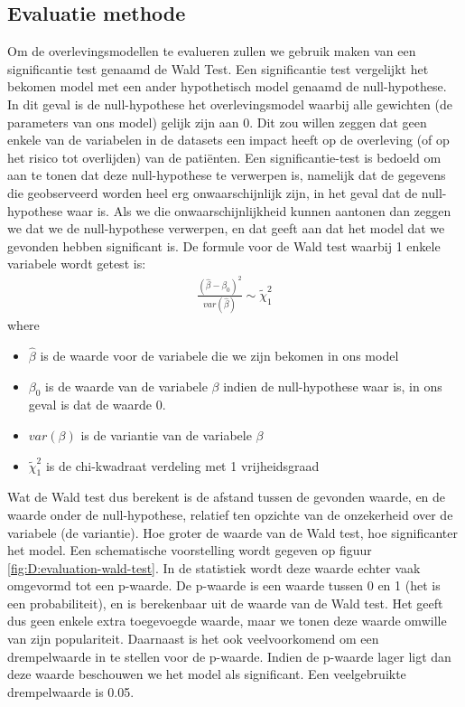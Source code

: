 \subsection{Evaluatie methode}
Om de overlevingsmodellen te evalueren zullen we gebruik maken van een significantie test genaamd de Wald Test. Een significantie test vergelijkt het bekomen model met een ander hypothetisch model genaamd de null-hypothese. In dit geval is de null-hypothese het overlevingsmodel waarbij alle gewichten (de parameters van ons model) gelijk zijn aan 0. Dit zou willen zeggen dat geen enkele van de variabelen in de datasets een impact heeft op de overleving (of op het risico tot overlijden) van de pati\"enten. Een significantie-test is bedoeld om aan te tonen dat deze null-hypothese te verwerpen is, namelijk dat de gegevens die geobserveerd worden heel erg onwaarschijnlijk zijn, in het geval dat de null-hypothese waar is. Als we die onwaarschijnlijkheid kunnen aantonen dan zeggen we dat we de null-hypothese verwerpen, en dat geeft aan dat het model dat we gevonden hebben significant is. De formule voor de Wald test waarbij 1 enkele variabele wordt getest is:
\begin{equation}
\begin{split}
\frac{(\hat{\beta}-\beta_{0})^{2}}{var(\hat{\beta})} \sim \tilde{\chi}^{2}_{1}
\end{split}
\end{equation}
where
\begin{itemize}
	\item $\hat{\beta}$ is de waarde voor de variabele die we zijn bekomen in ons model
	\item $\beta_{0}$ is de waarde van de variabele $\beta$ indien de null-hypothese waar is, in ons geval is dat de waarde 0.
	\item $var(\beta)$ is de variantie van de variabele $\beta$
	\item $\tilde{\chi}^{2}_{1}$ is de chi-kwadraat verdeling met 1 vrijheidsgraad
\end{itemize}
Wat de Wald test dus berekent is de afstand tussen de gevonden waarde, en de waarde onder de null-hypothese, relatief ten opzichte van de onzekerheid over de variabele (de variantie). Hoe groter de waarde van de Wald test, hoe significanter het model. Een schematische voorstelling wordt gegeven op figuur \ref{fig:D:evaluation-wald-test}. In de statistiek wordt deze waarde echter vaak omgevormd tot een p-waarde. De p-waarde is een waarde tussen 0 en 1 (het is een probabiliteit), en is berekenbaar uit de waarde van de Wald test. Het geeft dus geen enkele extra toegevoegde waarde, maar we tonen deze waarde omwille van zijn populariteit. Daarnaast is het ook veelvoorkomend om een drempelwaarde in te stellen voor de p-waarde. Indien de p-waarde lager ligt dan deze waarde beschouwen we het model als significant. Een veelgebruikte drempelwaarde is 0.05.
